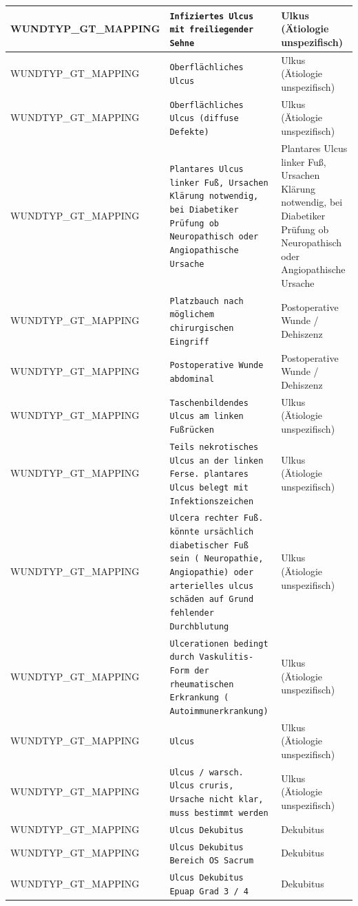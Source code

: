 \begin{longtable}{|p{3.5cm}|p{5cm}|p{6.5cm}|}
WUNDTYP\_GT\_MAPPING & \texttt{Infiziertes Ulcus mit freiliegender Sehne} & Ulkus (Ätiologie unspezifisch) \\ \hline
WUNDTYP\_GT\_MAPPING & \texttt{Oberflächliches Ulcus} & Ulkus (Ätiologie unspezifisch) \\ \hline
WUNDTYP\_GT\_MAPPING & \texttt{Oberflächliches Ulcus (diffuse Defekte)} & Ulkus (Ätiologie unspezifisch) \\ \hline
WUNDTYP\_GT\_MAPPING & \texttt{Plantares Ulcus linker Fuß, Ursachen Klärung notwendig, bei Diabetiker Prüfung ob Neuropathisch oder Angiopathische Ursache} & Plantares Ulcus linker Fuß, Ursachen Klärung notwendig, bei Diabetiker Prüfung ob Neuropathisch oder Angiopathische Ursache \\ \hline
WUNDTYP\_GT\_MAPPING & \texttt{Platzbauch nach möglichem chirurgischen Eingriff} & Postoperative Wunde / Dehiszenz \\ \hline
WUNDTYP\_GT\_MAPPING & \texttt{Postoperative Wunde abdominal} & Postoperative Wunde / Dehiszenz \\ \hline
WUNDTYP\_GT\_MAPPING & \texttt{Taschenbildendes Ulcus am linken Fußrücken} & Ulkus (Ätiologie unspezifisch) \\ \hline
WUNDTYP\_GT\_MAPPING & \texttt{Teils nekrotisches Ulcus an der linken Ferse.
plantares Ulcus belegt mit Infektionszeichen} & Ulkus (Ätiologie unspezifisch) \\ \hline
WUNDTYP\_GT\_MAPPING & \texttt{Ulcera rechter Fuß. könnte ursächlich diabetischer Fuß sein ( Neuropathie, Angiopathie) oder arterielles ulcus schäden auf Grund fehlender Durchblutung} & Ulkus (Ätiologie unspezifisch) \\ \hline
WUNDTYP\_GT\_MAPPING & \texttt{Ulcerationen bedingt durch Vaskulitis- Form der rheumatischen Erkrankung ( Autoimmunerkrankung)} & Ulkus (Ätiologie unspezifisch) \\ \hline
WUNDTYP\_GT\_MAPPING & \texttt{Ulcus} & Ulkus (Ätiologie unspezifisch) \\ \hline
WUNDTYP\_GT\_MAPPING & \texttt{Ulcus / warsch. Ulcus cruris, Ursache nicht klar, muss bestimmt werden} & Ulkus (Ätiologie unspezifisch) \\ \hline
WUNDTYP\_GT\_MAPPING & \texttt{Ulcus Dekubitus} & Dekubitus \\ \hline
WUNDTYP\_GT\_MAPPING & \texttt{Ulcus Dekubitus Bereich OS Sacrum} & Dekubitus \\ \hline
WUNDTYP\_GT\_MAPPING & \texttt{Ulcus Dekubitus Epuap Grad 3 / 4} & Dekubitus \\ \hline

\end{longtable}
